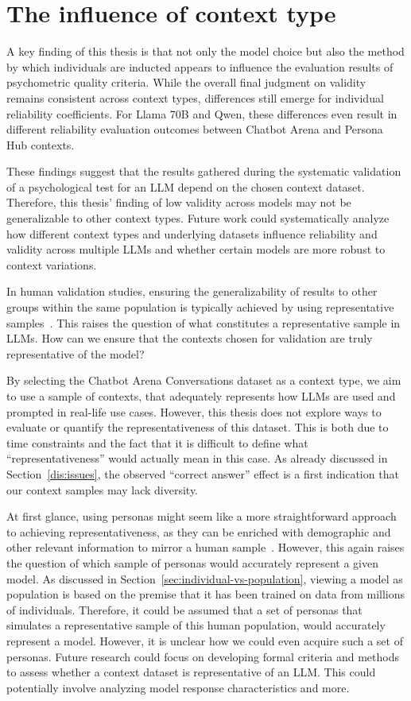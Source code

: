 \documentclass{DESSThesis}
\begin{document}
\section{The influence of context type}
\label{dis:context-influence}
A key finding of this thesis is that not only the model choice but also the method by which individuals are inducted appears to influence the evaluation results of psychometric quality criteria. While the overall final judgment on validity remains consistent across context types, differences still emerge for individual reliability coefficients. 
For Llama 70B and Qwen, these differences even result in different reliability evaluation outcomes between Chatbot Arena and Persona Hub contexts. 

These findings suggest that the results gathered during the systematic validation of a psychological test for an LLM depend on the chosen context dataset. Therefore, this thesis' finding of low validity across models may not be generalizable to other context types.
Future work could systematically analyze how different context types and underlying datasets influence reliability and validity across multiple LLMs and whether certain models are more robust to context variations.

In human validation studies, ensuring the generalizability of results to other groups within the same population is typically achieved by using representative samples~\cite{apa_dictionary_of_psychology_representative_2023}.
This raises the question of what constitutes a representative sample in LLMs.
How can we ensure that the contexts chosen for validation are truly representative of the model? 

By selecting the Chatbot Arena Conversations dataset as a context type, we aim to use a sample of contexts, that adequately represents how LLMs are used and prompted in real-life use cases.
However, this thesis does not explore ways to evaluate or quantify the representativeness of this dataset. This is both due to time constraints and the fact that it is difficult to define what ``representativeness'' would actually mean in this case. As already discussed in Section~\ref{dis:issues}, the observed ``correct answer'' effect is a first indication that our context samples may lack diversity.

At first glance, using personas might seem like a more straightforward approach to achieving representativeness, as they can be enriched with demographic and other relevant information to mirror a human sample~\cite{argyle_out_2023}. However, this again raises the question of which sample of personas would accurately represent a given model. As discussed in Section~\ref{sec:individual-vs-population}, viewing a model as population is based on the premise that it has been trained on data from millions of individuals. Therefore, it could be assumed that a set of personas that simulates a representative sample of this human population, would accurately represent a model. However, it is unclear how we could even acquire such a set of personas.
Future research could focus on developing formal criteria and methods to assess whether a context dataset is representative of an LLM. This could potentially involve analyzing model response characteristics and more.
\end{document}
